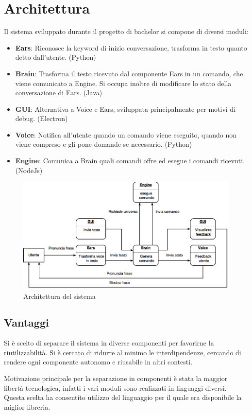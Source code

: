 \documentclass[twoside]{supsistudent}
\begin{document}
\chapter{Architettura}
Il sistema sviluppato durante il progetto di bachelor si compone di diversi moduli:
\begin{itemize}
	\item \textbf{Ears}: Riconosce la keyword di inizio conversazione, trasforma in testo quanto detto dall'utente. (Python)
	\item \textbf{Brain}: Trasforma il testo ricevuto dal componente Ears in un comando, che viene comunicato a Engine. Si occupa inoltre di modificare lo stato della conversazione di Ears. (Java)
	\item \textbf{GUI}: Alternativa a Voice e Ears, sviluppata principalmente per motivi di debug. (Electron)
	\item \textbf{Voice}: Notifica all'utente quando un comando viene eseguito, quando non viene compreso e gli pone domande se necessario. (Python)
	\item \textbf{Engine}: Comunica a Brain quali comandi offre ed esegue i comandi ricevuti. (NodeJs)
\end{itemize}
\begin{figure}[H]
\centering
\includegraphics[width=\textwidth]{Architettura}
\caption{Architettura del sistema}
\label{fig:pose}
\end{figure}
\section{Vantaggi}
Si è scelto di separare il sistema in diverse componenti per favorirne la riutilizzabilità. Si è cercato di ridurre al minimo le interdipendenze, cercando di rendere ogni componente autonomo e riusabile in altri contesti.

Motivazione principale per la separazione in componenti è stata la maggior libertà tecnologica, infatti i vari moduli sono realizzati in linguaggi diversi. 
Questa scelta ha consentito utilizzo del linguaggio per il quale era disponibile la miglior libreria.
\end{document}
